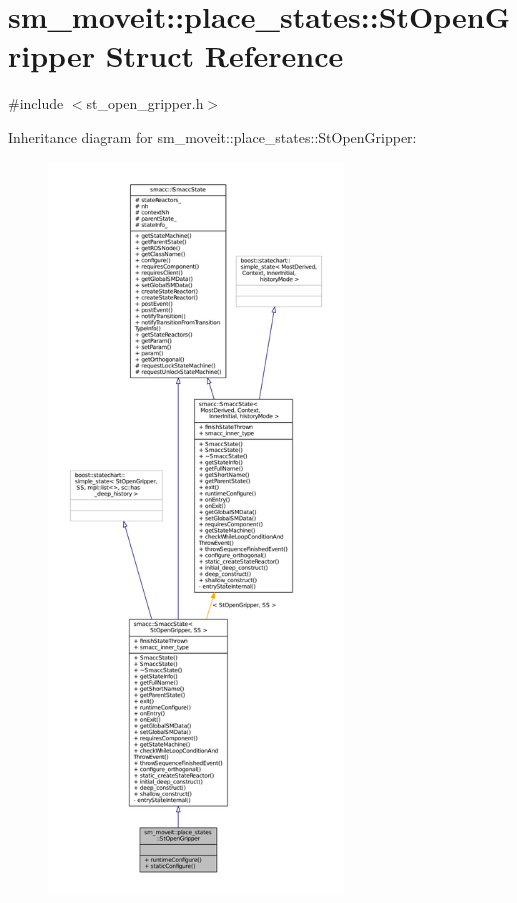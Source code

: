 \hypertarget{structsm__moveit_1_1place__states_1_1StOpenGripper}{}\section{sm\+\_\+moveit\+:\+:place\+\_\+states\+:\+:St\+Open\+Gripper Struct Reference}
\label{structsm__moveit_1_1place__states_1_1StOpenGripper}


{\ttfamily \#include $<$st\+\_\+open\+\_\+gripper.\+h$>$}



Inheritance diagram for sm\+\_\+moveit\+:\+:place\+\_\+states\+:\+:St\+Open\+Gripper\+:
\nopagebreak
\begin{figure}[H]
\begin{center}
\leavevmode
\includegraphics[height=550pt]{structsm__moveit_1_1place__states_1_1StOpenGripper__inherit__graph}
\end{center}
\end{figure}


